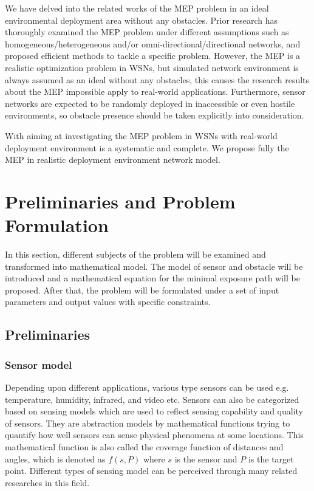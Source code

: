 \documentclass[final]{elsarticle}
\begin{document}
We have delved into the related works of the MEP problem in an ideal environmental deployment area without any obstacles. Prior research has thoroughly examined the MEP problem under different assumptions such as homogeneous/heterogeneous and/or omni-directional/directional networks, and proposed efficient methods to tackle a specific problem. However, the MEP is a realistic optimization problem in WSNs, but simulated network environment is always assumed as an ideal without any obstacles, this causes the research results about the MEP impossible apply to real-world applications. Furthermore, sensor networks are expected to be randomly deployed in inaccessible or even hostile environments, so obstacle presence should be taken explicitly into consideration.

With aiming at investigating the MEP problem in WSNs with real-world deployment environment is a systematic and complete. We propose fully the MEP in realistic deployment environment network model. 
\section{Preliminaries and Problem Formulation}
In this section, different subjects of the problem will be examined and transformed into mathematical model. The model of sensor and obstacle will be introduced and a mathematical equation for the minimal exposure path will be proposed. After that, the problem will be formulated under a set of input parameters and output values with specific constraints.
\subsection{Preliminaries}
\subsubsection{Sensor model}
Depending upon different applications, various type sensors can be used e.g. temperature, humidity, infrared, and video etc. Sensors can also be categorized based on sensing models which are used to reflect sensing capability and quality of sensors. They are abstraction models by mathematical functions trying to quantify how well sensors can sense physical phenomena at some locations. This mathematical function is also called the coverage function of distances and angles, which is denoted as $f(s, P)$ where $ s $ is the sensor and $ P $ is the target point. Different types of sensing model can be perceived through many related researches in this field.
\end{document}
